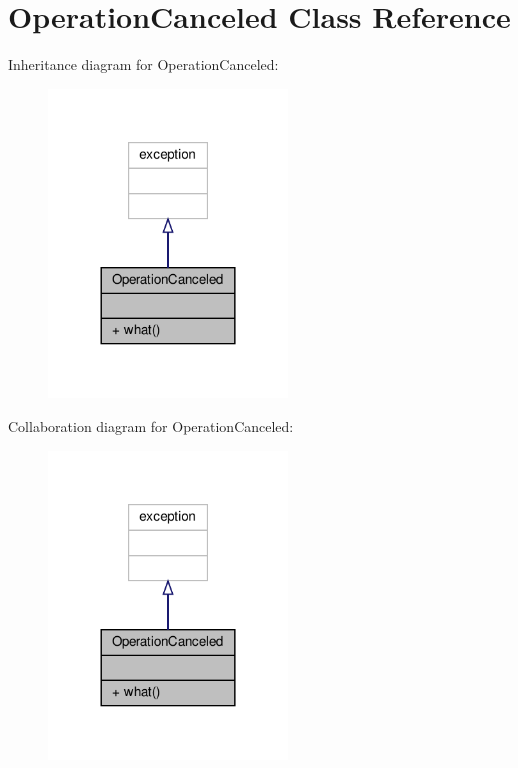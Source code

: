 \hypertarget{classOperationCanceled}{}\section{Operation\+Canceled Class Reference}
\label{classOperationCanceled}


Inheritance diagram for Operation\+Canceled\+:
\nopagebreak
\begin{figure}[H]
\begin{center}
\leavevmode
\includegraphics[width=180pt]{classOperationCanceled__inherit__graph}
\end{center}
\end{figure}


Collaboration diagram for Operation\+Canceled\+:
\nopagebreak
\begin{figure}[H]
\begin{center}
\leavevmode
\includegraphics[width=180pt]{classOperationCanceled__coll__graph}
\end{center}
\end{figure}
